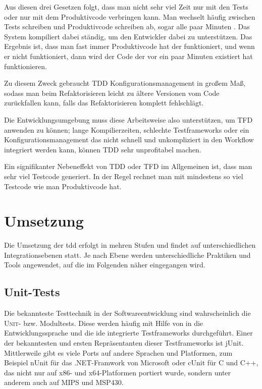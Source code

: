 \documentclass{mitschrift}
\newcommand{\pje}{\marginpar{Philipp\\Jeske}}
\begin{document}
Aus diesen drei Gesetzen folgt, dass man nicht sehr viel Zeit nur mit den Tests
oder nur mit dem Produktivcode verbringen kann. Man wechselt häufig zwischen
Tests schreiben und Produktivcode schreiben ab, sogar alle paar Minuten
\cite{itAgile, UncleBob}. Das System kompiliert dabei ständig, um den
Entwickler dabei zu unterstützen. Das Ergebnis ist, dass man fast immer
Produktivcode hat der funktioniert, und wenn er nicht funktioniert, dann wird
der Code der vor ein paar Minuten existiert hat funktionieren.

Zu diesem Zweck gebraucht TDD Konfigurationsmanagement in großem Maß, sodass
man beim Refaktorisieren leicht zu ältere Versionen vom Code zurückfallen kann,
falls das Refaktorisieren komplett fehlschlägt.

Die Entwicklungsumgebung muss diese Arbeitsweise also unterstützen, um TFD
anwenden zu können; lange Kompilierzeiten, schlechte Testframeworks oder ein
Konfigurationsmanagement das nicht schnell und unkompliziert in den Workflow
integriert werden kann, können TDD sehr unprofitabel machen.

Ein signifikanter Nebeneffekt von TDD oder TFD im Allgemeinen ist, dass man
sehr viel Testcode generiert. In der Regel rechnet man mit mindestens so viel
Testcode wie man Produktivcode hat. \cite{SQlite3, C2}

\chapter{Umsetzung}\label{Umsetzung}\pje
Die Umsetzung der \gls{tdd} erfolgt in mehren Stufen und findet auf
unterschiedlichen Integrationsebenen statt. Je nach Ebene werden
unterschiedliche Praktiken und Tools angewendet, auf die im Folgenden näher
eingegangen wird.

\section{Unit-Tests}
Die bekannteste Testtechnik in der Softwareentwicklung sind wahrscheinlich die
\textsc{Unit}- bzw. Modultests. Diese werden häufig mit Hilfe von in die
Entwicklungssprache und die \gls{ide} integrierte Testframeworks durchgeführt.
Einer der bekanntesten und ersten Repräsentanten dieser Testframeworks ist
jUnit. Mittlerweile gibt es viele Ports auf andere Sprachen und Platformen, zum
Beispiel nUnit für das .NET-Framwork von Microsoft oder cUnit für C und C++,
das nicht nur auf x86- und x64-Platformen portiert wurde, sondern unter anderem
auch auf MIPS und MSP430.
\end{document}
